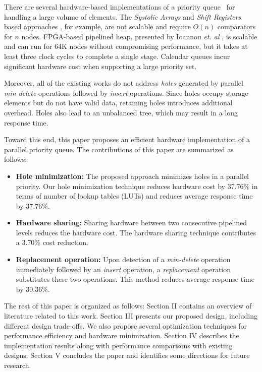 \documentclass[10pt, conference, compsocconf]{IEEEtran}
\begin{document}
There are several hardware-based implementations of a priority queue~\cite{hw1,hw2,hw8,hw9,fpga1,fpga2,fpga3} for handling a large volume of elements.
The {\it Systolic Arrays} and {\it Shift Registers} based approaches \cite{hw8,hw9}, for example, are not scalable and require $O(n)$ comparators for $n$ nodes.
FPGA-based pipelined heap, presented by Ioannou {\it et. al} \cite{fpga1}, is scalable and can run for 64K nodes without compromising performance, but it takes at least three clock cycles to complete a single stage.
Calendar queues \cite{hw1} incur significant hardware cost when supporting a large priority set.

Moreover, all of the existing works do not address {\it holes} generated by parallel {\it min-delete} operations followed by {\it insert} operations.
Since holes occupy storage elements but do not have valid data, retaining holes introduces additional overhead.
Holes also lead to an unbalanced tree, which may result in a long response time.

Toward this end, this paper proposes an efficient hardware implementation of a parallel priority queue.
The contributions of this paper are summarized as follows:
\begin{itemize}
\item {\bf Hole minimization:} The proposed approach minimizes holes in a parallel priority. Our hole minimization technique reduces hardware cost by 37.76\% in terms of number of lookup tables (LUTs) and reduces average response time by 37.76\%.
\item {\bf Hardware sharing:} Sharing hardware between two consecutive pipelined levels reduces the hardware cost. The hardware sharing technique contributes a 3.70\% cost reduction.
\item {\bf Replacement operation:} Upon detection of a {\it min-delete} operation immediately followed by an {\it insert} operation, a {\it replacement} operation substitutes these two operations. This method reduces average response time by 30.36\%.
\end{itemize}

The rest of this paper is organized as follows: Section II contains an overview of literature related to this work.
Section III presents our proposed design, including different design trade-offs. We also propose several optimization techniques for performance efficiency and hardware minimization.
Section IV describes the implementation results along with performance comparisons with existing designs.
Section V concludes the paper and identifies some directions for future research.
\end{document}
